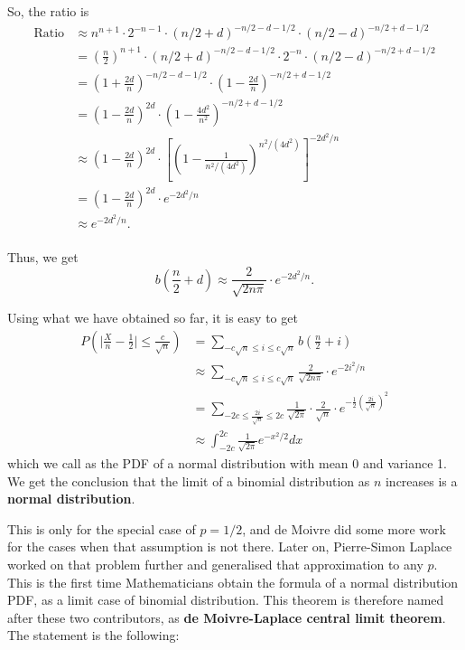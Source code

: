 \documentclass[11pt, a4paper, oneside]{book}
\theoremstyle{definition}
\begin{document}
\noindent So, the ratio is
\begin{equation*}
\begin{split}
\text{Ratio} &\approx n^{n+1} \cdot 2^{-n-1} \cdot (n/2+d)^{-n/2-d-1/2} \cdot (n/2-d)^{-n/2+d-1/2} \\
&= {(\frac{n}{2})}^{n+1} \cdot (n/2+d)^{-n/2-d-1/2} \cdot 2^{-n} \cdot (n/2-d)^{-n/2+d-1/2} \\
&= (1+\frac{2d}{n})^{-n/2-d-1/2} \cdot (1-\frac{2d}{n})^{-n/2+d-1/2} \\
&= (1-\frac{2d}{n})^{2d} \cdot (1-\frac{4d^2}{n^2})^{-n/2+d-1/2} \\ 
&\approx (1-\frac{2d}{n})^{2d} \cdot [(1-\frac{1}{n^2/(4d^2)})^{n^2/(4d^2)}]^{-2d^2/n} \\ 
&= (1-\frac{2d}{n})^{2d} \cdot e^{-2d^2/n} \\ 
&\approx e^{-2d^2/n}. \\ 
\end{split}
\end{equation*}

\noindent Thus, we get \[
b(\frac{n}{2} + d) \approx \frac{2}{\sqrt{2n\pi}} \cdot e^{-2d^2/n}.
\]

\noindent Using what we have obtained so far, it is easy to get
\begin{equation*}
\begin{split}
P(\mid \frac{X}{n} - \frac{1}{2} \mid \le \frac{c}{\sqrt{n}}) &= \sum_{-c\sqrt{n} \le i \le c\sqrt{n}}b(\frac{n}{2} + i) \\
&\approx \sum_{-c\sqrt{n} \le i \le c\sqrt{n}} \frac{2}{\sqrt{2n\pi}} \cdot e^{-2i^2/n} \\
&= \sum_{-2c \le \frac{2i}{\sqrt{n}} \le 2c} \frac{1}{\sqrt{2\pi}} \cdot \frac{2}{\sqrt{n}} \cdot e^{-\frac{1}{2}(\frac{2i}{\sqrt{n}})^2} \\
&\approx \int_{-2c}^{2c} \frac{1}{\sqrt{2\pi}} e^{-x^2 /2} dx
\end{split}
\end{equation*}
which we call as the PDF of a normal distribution with mean 0 and variance 1. We get the conclusion that the limit of a binomial distribution as $n$ increases is a \textbf{normal distribution}.

\noindent This is only for the special case of $p = 1/2$, and de Moivre did some more work for the cases when that assumption is not there. Later on, Pierre-Simon Laplace worked on that problem further and generalised that approximation to any $p$. This is the first time Mathematicians obtain the formula of a normal distribution PDF, as a limit case of binomial distribution. This theorem is therefore named after these two contributors, as \textbf{de Moivre-Laplace central limit theorem}. The statement is the following:
\end{document}
